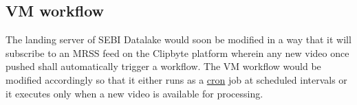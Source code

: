 \subsection{VM workflow} \label{future}

The landing server of SEBI Datalake would soon be modified in a way that it will subscribe to an MRSS feed on the Clipbyte platform wherein any new video once pushed shall automatically trigger a workflow. The VM workflow would be modified accordingly so that it either runs as a \href{https://en.wikipedia.org/wiki/Cron}{cron} job at scheduled intervals or it executes only when a new video is available for processing.
